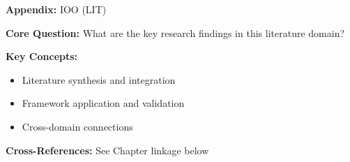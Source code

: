 
\begin{tcolorbox}[colback=blue!5!white, colframe=blue!75!black,
    title=Quick Reference: Appendix IOO]
\textbf{Appendix:} IOO (LIT)

\textbf{Core Question:} What are the key research findings in this literature domain?

\textbf{Key Concepts:}
\begin{itemize}[nosep]
\item Literature synthesis and integration
\item Framework application and validation
\item Cross-domain connections
\end{itemize}

\textbf{Cross-References:} See Chapter linkage below
\end{tcolorbox}


\begin{abstract}
This appendix provides a systematic review and integration of key research findings
in the LIT domain. It synthesizes literature relevant to the Evidence-Based
Framework (EBF) and identifies connections to the 10C CORE architecture.
\end{abstract}


